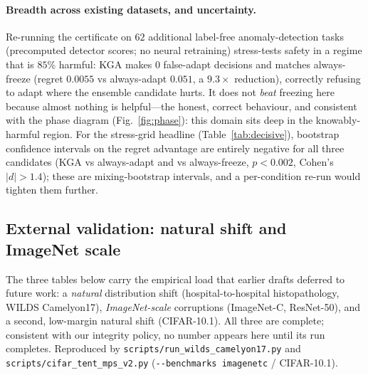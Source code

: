 \documentclass[conference]{IEEEtran}
\theoremstyle{plain}
\theoremstyle{definition}
\begin{document}
\paragraph{Breadth across existing datasets, and uncertainty.} Re-running the certificate on
$62$ additional label-free anomaly-detection tasks (precomputed detector scores; no neural
retraining) stress-tests safety in a regime that is $85\%$ harmful: \textsc{KGA} makes $0$
false-adapt decisions and matches always-freeze (regret $0.0055$ vs always-adapt $0.051$, a
$9.3\times$ reduction), correctly refusing to adapt where the ensemble candidate hurts. It does
not \emph{beat} freezing here because almost nothing is helpful---the honest, correct behaviour,
and consistent with the phase diagram (Fig.~\ref{fig:phase}): this domain sits deep in the
knowably-harmful region. For the stress-grid headline (Table~\ref{tab:decisive}), bootstrap
confidence intervals on the regret advantage are entirely negative for all three candidates
(\textsc{KGA} vs always-adapt and vs always-freeze, $p<0.002$, Cohen's $|d|>1.4$); these are
mixing-bootstrap intervals, and a per-condition re-run would tighten them further.

\subsection{External validation: natural shift and ImageNet scale}\label{sec:external}
The three tables below carry the empirical load that earlier drafts deferred to future work:
a \emph{natural} distribution shift (hospital-to-hospital histopathology, WILDS Camelyon17),
\emph{ImageNet-scale} corruptions (ImageNet-C, ResNet-50), and a second, low-margin natural
shift (CIFAR-10.1). All three are complete; consistent with our integrity policy, no number
appears here until its run completes. Reproduced by
\texttt{scripts/run\_wilds\_camelyon17.py} and
\texttt{scripts/cifar\_tent\_mps\_v2.py} (\texttt{-{}-benchmarks imagenetc} / CIFAR-10.1).
\end{document}
